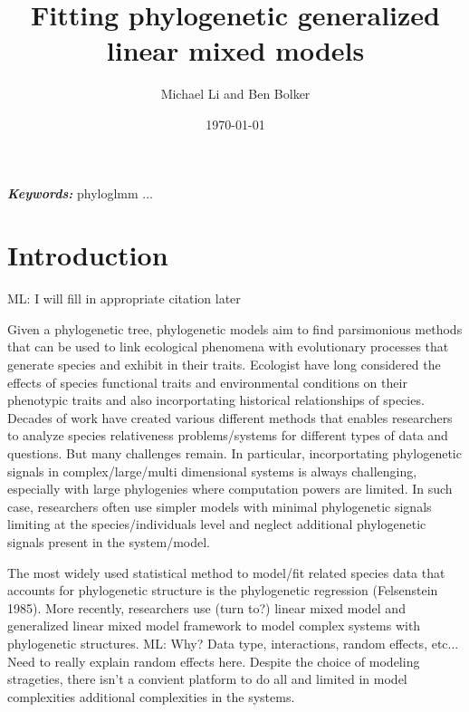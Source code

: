 \documentclass[12pt]{article}
\title{Fitting phylogenetic generalized linear mixed models}
\author{Michael Li and Ben Bolker}
\date{\today}
\providecommand{\keywords}[1]{\textbf{\textit{Keywords:}} #1}
\begin{document}
\newcommand{\dbic}{\ensuremath \Delta \textrm{BIC}}

\newcommand{\bmbhide}[1]{}
\newcommand{\bmb}[1]{{\color{blue} BB: #1}}

\newcommand{\fref}[1]{Figure~\ref{fig:#1}}

\newcommand{\ml}[1]{{\color{red} ML: #1}}

\newcommand{\add}[1]{{\color{blue} ADD: #1}}

\maketitle

\doublespacing

\keywords{phyloglmm ... }

\section{Introduction}
\ml{I will fill in appropriate citation later}


Given a phylogenetic tree, phylogenetic models aim to find parsimonious methods that can be used to link ecological phenomena with evolutionary processes that generate species and exhibit in their traits.
Ecologist have long considered the effects of species functional traits and environmental conditions on their phenotypic traits and also incorportating historical relationships of species.
Decades of work have created various different methods that enables researchers to analyze species relativeness problems/systems for different types of data and questions.
But many challenges remain.
In particular, incorportating phylogenetic signals in complex/large/multi dimensional systems is always challenging, especially with large phylogenies where computation powers are limited.
In such case, researchers often use simpler models with minimal phylogenetic signals limiting at the species/individuals level and neglect additional phylogenetic signals present in the system/model.

The most widely used statistical method to model/fit related species data that accounts for phylogenetic structure is the phylogenetic regression (Felsenstein 1985). 
More recently, researchers use (turn to?) linear mixed model and generalized linear mixed model framework to model complex systems with phylogenetic structures. 
\ml{Why? Data type, interactions, random effects, etc... Need to really explain random effects here.}
Despite the choice of modeling strageties, there isn't a convient platform to do all and limited in model complexities additional complexities in the systems. 
\end{document}
